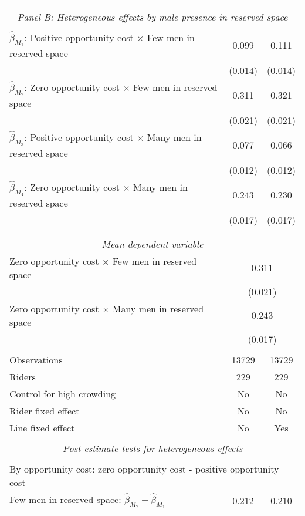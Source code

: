 \begin{tabular}{l*{2}{c}}
\hline \\[-1ex] \multicolumn{3}{c}{\textit{Panel B: Heterogeneous effects by male presence in reserved space}} \\\\[-1ex]
$\hat\beta_{M_1}$: Positive opportunity cost $\times$ Few men in reserved space&       0.099\sym{***}&       0.111\sym{***}\\
                    &     (0.014)         &     (0.014)         \\
[1em]
$\hat\beta_{M_2}$: Zero opportunity cost $\times$ Few men in reserved space&       0.311\sym{***}&       0.321\sym{***}\\
                    &     (0.021)         &     (0.021)         \\
[1em]
$\hat\beta_{M_3}$: Positive opportunity cost $\times$ Many men in reserved space&       0.077\sym{***}&       0.066\sym{***}\\
                    &     (0.012)         &     (0.012)         \\
[1em]
$\hat\beta_{M_4}$: Zero opportunity cost $\times$ Many men in reserved space&       0.243\sym{***}&       0.230\sym{***}\\
                    &     (0.017)         &     (0.017)         \\
\\[-1.8ex] \hline \\[-1.8ex] \multicolumn{3}{c}{\textit{Mean dependent variable}} \\ Zero opportunity cost $\times$ Few men in reserved space & \multicolumn{2}{c}{0.311} \\ & \multicolumn{2}{c}{(0.021)} \\ Zero opportunity cost $\times$ Many men in reserved space & \multicolumn{2}{c}{0.243} \\ & \multicolumn{2}{c}{(0.017)} \\\\[-1ex] 
Observations        &       13729         &       13729         \\
Riders              &         229         &         229         \\
Control for high crowding&          No         &          No         \\
Rider fixed effect  &          No         &          No         \\
Line fixed effect   &          No         &         Yes         \\
\hline \\[-1ex]  \multicolumn{3}{c}{\textit{Post-estimate tests for heterogeneous effects}} \\\\[-1ex] \multicolumn{3}{l}{By opportunity cost: zero opportunity cost - positive opportunity cost} \\ \quad Few men in reserved space: $\hat\beta_{M_2} - \hat\beta_{M_1}$&       0.212         &       0.210         \\

\end{tabular}
